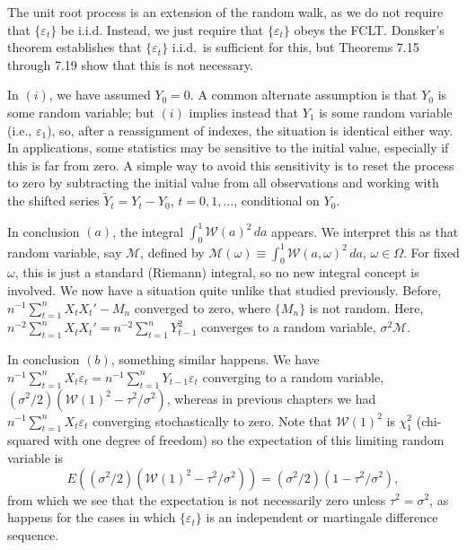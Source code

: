 The unit root process is an extension of the random walk, as we do not require that $\{\varepsilon_t\}$ be i.i.d. Instead, we just require that $\{\varepsilon_t\}$ obeys the FCLT. Donsker's theorem establishes that $\{\varepsilon_t\}$ i.i.d.\ is sufficient for this, but Theorems 7.15 through 7.19 show that this is not necessary.

In $(i)$, we have assumed $Y_0 = 0$. A common alternate assumption is that $Y_0$ is some random variable; but $(i)$ implies instead that $Y_1$ is some random variable (i.e., $\varepsilon_1$), so, after a reassignment of indexes, the situation is identical either way. In applications, some statistics may be sensitive to the initial value, especially if this is far from zero. A simple way to avoid this sensitivity is to reset the process to zero by subtracting the initial value from all observations and working with the shifted series $\tilde{Y}_t = Y_t - Y_0$, $t = 0, 1, \ldots$, conditional on $Y_0$.

In conclusion $(a)$, the integral $\int_0^1 \mathcal{W}(a)^2\,da$ appears. We interpret this as that random variable, say $\mathcal{M}$, defined by $\mathcal{M}(\omega) \equiv \int_0^1 \mathcal{W}(a,\omega)^2\,da$, $\omega \in \Omega$. For fixed $\omega$, this is just a standard (Riemann) integral, so no new integral concept is involved. We now have a situation quite unlike that studied previously. Before, $n^{-1}\sum_{t=1}^{n} X_t X_t' - M_n$ converged to zero, where $\{M_n\}$ is not random. Here, $n^{-2}\sum_{t=1}^{n} X_t X_t' = n^{-2}\sum_{t=1}^{n} Y_{t-1}^2$ converges to a random variable, $\sigma^2 \mathcal{M}$.

In conclusion $(b)$, something similar happens. We have $n^{-1}\sum_{t=1}^{n} X_t \varepsilon_t = n^{-1}\sum_{t=1}^{n} Y_{t-1}\varepsilon_t$ converging to a random variable, $(\sigma^2/2)\left(\mathcal{W}(1)^2 - \tau^2/\sigma^2\right)$, whereas in previous chapters we had $n^{-1}\sum_{t=1}^{n} X_t \varepsilon_t$ converging stochastically to zero. Note that $\mathcal{W}(1)^2$ is $\chi_1^2$ (chi-squared with one degree of freedom) so the expectation of this limiting random variable is
\[
E\left((\sigma^2/2)\left(\mathcal{W}(1)^2 - \tau^2/\sigma^2\right)\right) = (\sigma^2/2)\left(1 - \tau^2/\sigma^2\right),
\]
from which we see that the expectation is not necessarily zero unless $\tau^2 = \sigma^2$, as happens for the cases in which $\{\varepsilon_t\}$ is an independent or martingale difference sequence.

